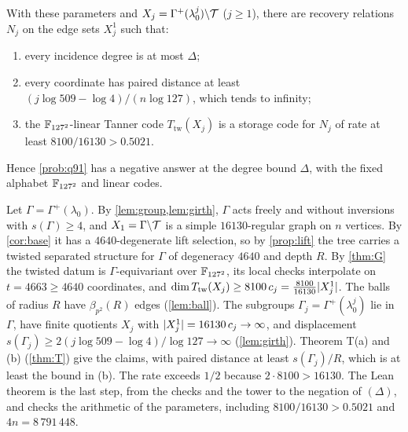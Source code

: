 \begin{theorem}[Theorem A]\label{thm:A}
With these parameters and $X_j=\Gamma^+(\lambda_0^j)\backslash\mathcal{T}$ ($j\ge1$), there are recovery relations $N_j$ on the
edge sets $X_j^1$ such that:
\begin{enumerate}[label=(\alph*)]
\item every incidence degree is at most $\Delta$;
\item every coordinate has paired distance at least $(j\log509-\log4)/(n\log127)$, which tends to infinity;
\item the $\mathbb{F}_{127^2}$-linear Tanner code $T_{\mathrm{tw}}(X_j)$ is a storage code for $N_j$ of rate at least
$8100/16130>0.5021$.
\end{enumerate}
Hence \cref{prob:q91} has a negative answer at the degree bound $\Delta$, with the fixed alphabet $\mathbb{F}_{127^2}$ and linear codes.
\end{theorem}
\begin{outline}
Let $\Gamma=\Gamma^+(\lambda_0)$. By \cref{lem:group,lem:girth}, $\Gamma$ acts freely and without inversions with
$s(\Gamma)\ge4$, and $X_1=\Gamma\backslash\mathcal{T}$ is a simple $16130$-regular graph on $n$ vertices. By \cref{cor:base} it
has a $4640$-degenerate lift selection, so by \cref{prop:lift} the tree carries a twisted separated structure for $\Gamma$
of degeneracy $4640$ and depth $R$. By \cref{thm:G} the twisted datum is $\Gamma$-equivariant over $\mathbb{F}_{127^2}$, its local
checks interpolate on $t=4663\ge4640$ coordinates, and $\dim T_{\mathrm{tw}}(X_j)\ge8100\,c_j=\frac{8100}{16130}\lvert X_j^1 \rvert$.
The balls of radius $R$ have $\beta_{p^2}(R)$ edges (\cref{lem:ball}). The subgroups $\Gamma_j=\Gamma^+(\lambda_0^j)$ lie in
$\Gamma$, have finite quotients $X_j$ with $\lvert X_j^1 \rvert=16130\,c_j\to\infty$, and displacement
$s(\Gamma_j)\ge2(j\log509-\log4)/\log127\to\infty$ (\cref{lem:girth}). Theorem T(a) and (b) (\cref{thm:T}) give the
claims, with paired distance at least $s(\Gamma_j)/R$, which is at least the bound in (b). The rate exceeds $1/2$ because
$2\cdot8100>16130$. The Lean theorem  is the last step, from the checks and the
tower to the negation of $(\Delta)$, and  checks the arithmetic of
the parameters, including $8100/16130>0.5021$ and $4n=8\,791\,448$.
\end{outline}

